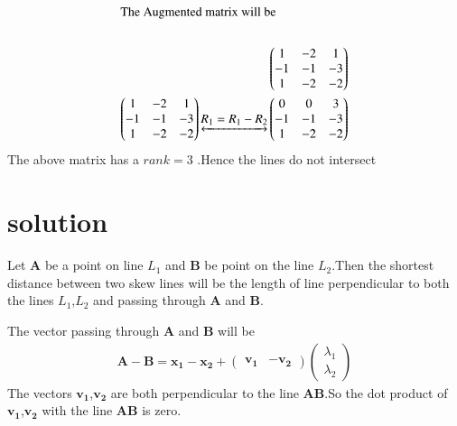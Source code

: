 \documentclass[journal,12pt,twocolumn]{IEEEtran}
\begin{document}
\begin{align}
    \intertext{The Augmented matrix will be}\\
    \begin{pmatrix}1 & -2 & 1\\-1 & -1 & -3\\1 & -2 & -2\end{pmatrix}\\
    \begin{pmatrix}1 & -2 & 1\\-1 & -1 & -3\\1 & -2 & -2\end{pmatrix}\underleftrightarrow{R_1=R_1-R_2}\begin{pmatrix}0 & 0 & 3\\-1 & -1 & -3\\1 & -2 & -2\end{pmatrix}
\end{align}
The above matrix has a $rank=3$ .Hence the lines do not intersect
\section{solution}
Let $\bm{A}$ be a point on line $L_1$ and $\bm{B}$ be point on the line $L_2$.Then the shortest distance between two skew lines will be the length of line perpendicular to both the lines $L_1$,$L_2$ and passing through $\bm{A}$ and $\bm{B}$.\par
\vspace{5mm}
The vector passing through $\bm{A}$ and $\bm{B}$ will be \\
\begin{align}
    \bm{A-B}=\bm{x_1-x_2}+\begin{pmatrix}\bm{v_1} & -\bm{v_2}\end{pmatrix}\begin{pmatrix}\lambda_1\\\lambda_2\end{pmatrix}
\end{align}
The vectors $\bm{v_1}$,$\bm{v_2}$ are both perpendicular to the line $\bm{AB}$.So the dot product of $\bm{v_1}$,$\bm{v_2}$ with the line $\bm{AB}$ is zero.\\
\end{document}
